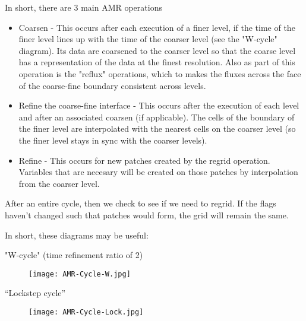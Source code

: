 In short, there are 3 main AMR operations 
\begin{itemize}

\item Coarsen - This occurs after each execution of a finer level, if
  the time of the finer level lines up with the time of the coarser
  level (see the "W-cycle" diagram). Its data are coarsened to the
  coarser level so that the coarse level has a representation of the
  data at the finest resolution. Also as part of this operation is the
  "reflux" operations, which to makes the fluxes across the face of
  the coarse-fine boundary consistent across levels.
\item Refine the coarse-fine interface - This occurs after the
  execution of each level and after an associated coarsen (if
  applicable). The cells of the boundary of the finer level are
  interpolated with the nearest cells on the coarser level (so the
  finer level stays in sync with the coarser levels).
\item Refine - This occurs for new patches created by the regrid
  operation. Variables that are necesary will be created on those
  patches by interpolation from the coarser level. 
\end{itemize}

After an entire cycle, then we check to see if we need to regrid. If the flags haven't changed such that patches would form, the grid will remain the same. 

In short, these diagrams may be useful: 

"W-cycle" (time refinement ratio of 2) 

\begin{figure}[h]
  \centering
  \texttt{[image: AMR-Cycle-W.jpg]}
  \caption{}
  \label{}
\end{figure}

``Lockstep cycle''

\begin{figure}[h]
  \centering
  \texttt{[image: AMR-Cycle-Lock.jpg]}
  \caption{}
  \label{}
\end{figure}
